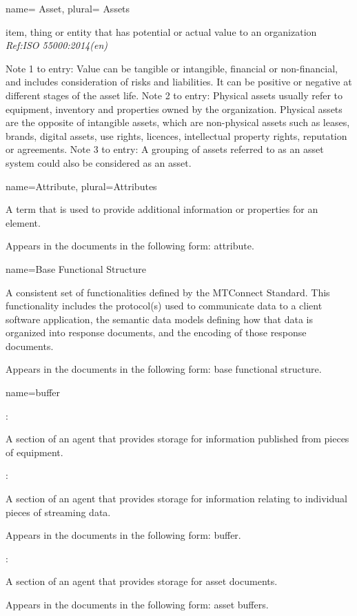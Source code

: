 {
  name= {Asset},
  plural= {Assets}
}
{
  item, thing or entity that has potential or actual value to an organization \textit{Ref:ISO 55000:2014(en)}
  
  \begin{note}
  Note 1 to entry: Value can be tangible or intangible, financial or non-financial, and includes consideration of risks and liabilities. It can be positive or negative at different stages of the asset life.
  \newline Note 2 to entry: Physical assets usually refer to equipment, inventory and properties owned by the organization. Physical assets are the opposite of intangible assets, which are non-physical assets such as leases, brands, digital assets, use rights, licences, intellectual property rights, reputation or agreements.
  \newline Note 3 to entry: A grouping of assets referred to as an asset system could also be considered as an asset.
  
  \end{note}
}


{
  name={Attribute},
  plural={Attributes}
}
{
  A term that is used to provide additional information or properties for an element.

  Appears in the documents in the following form: attribute.
}


{
  name={Base Functional Structure}
}
{
  A consistent set of functionalities defined by the MTConnect Standard. This functionality includes the protocol(s) used to communicate data to a client software application, the \glspl{semantic data model} defining how that data is organized into \glspl{response document}, and the encoding of those \glspl{response document}.

  Appears in the documents in the following form: \gls{base functional structure}.
}

{
  name={buffer}
}
{
  :

  A section of an \gls{agent} that provides storage for information published from pieces of equipment.

  :

  A section of an \gls{agent} that provides storage for information relating to individual pieces of \gls{streaming data}. 
  
  Appears in the documents in the following form: \gls{buffer}.

  :

  A section of an \gls{agent} that provides storage for \glspl{asset document}.

  Appears in the documents in the following form: \glspl{asset buffer}.
}

